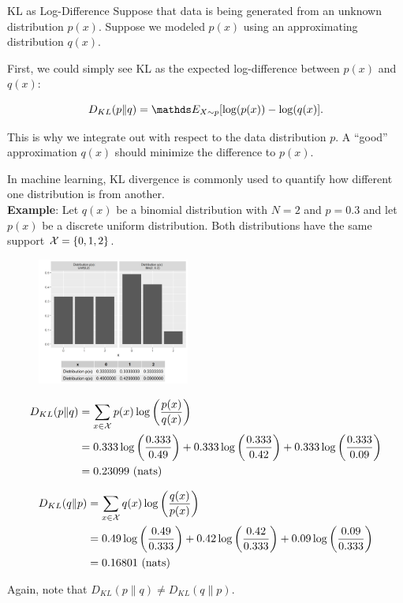 \documentclass[11pt,compress,t,notes=noshow, xcolor=table]{beamer}
\begin{document}
\begin{vbframe} {KL as Log-Difference}
Suppose that data is being generated from an unknown distribution $p(x)$. 
Suppose we modeled $p(x)$ using an approximating distribution $q(x)$. 

\lz

First, we could simply see KL as the expected log-difference between $p(x)$ and $q(x)$:

  $$ D_{KL}(p \| q) = \E_{X \sim p}[\log(p(x)) - \log(q(x)].$$

This is why we integrate out with respect to the data distribution $p$.
A \enquote{good} approximation $q(x)$ should minimize the difference to $p(x)$.

\framebreak

In machine learning, KL divergence is commonly used to quantify how different one distribution is from another.\\
\lz
\textbf{Example}:
Let $q(x)$ be a binomial distribution with $N = 2$ and $p = 0.3$ and let $p(x)$ be a discrete uniform distribution. Both distributions have the same support $\mathcal{X} = \{0, 1, 2\}$.

\begin{figure}
\includegraphics[width = 5cm ]{figure/kl_log_diff_plot.png} 
\end{figure}

\framebreak

\begin{equation*}
  \begin{split}
 D_{KL}(p \| q) &= \sum_{x \in \mathcal{X}} p(x) \log \left( \frac{p(x)}{q(x)} \right)
 \\ &= 0.333 \log \left( \frac{0.333}{0.49} \right) + 0.333 \log \left( \frac{0.333}{0.42} \right) + 0.333 \log \left( \frac{0.333}{0.09} \right) \\ &= 0.23099 \text{    (nats)}
  \end{split}
\end{equation*}

\begin{equation*}
  \begin{split}
 D_{KL}(q \| p) &= \sum_{x \in \mathcal{X}} q(x) \log \left( \frac{q(x)}{p(x)} \right)
 \\ &= 0.49 \log \left( \frac{0.49}{0.333} \right) + 0.42 \log \left( \frac{0.42}{0.333} \right) + 0.09 \log \left( \frac{0.09}{0.333} \right) \\ &= 0.16801 \text{    (nats)}
  \end{split}
\end{equation*}

Again, note that $D_{KL}(p \| q) \neq D_{KL}(q \| p)$.
\end{vbframe}
\end{document}
